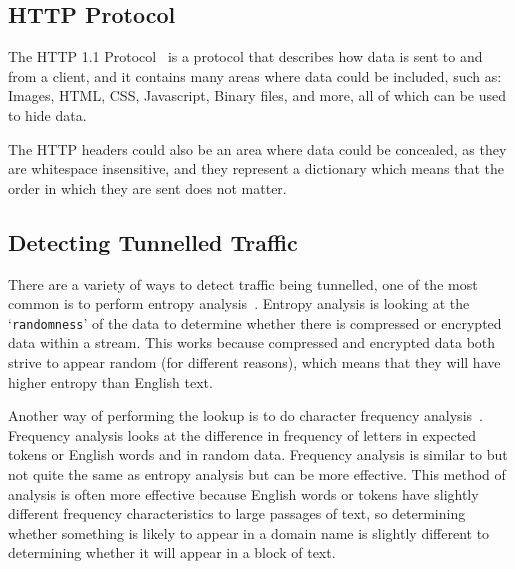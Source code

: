 \subsection{HTTP Protocol}
The HTTP 1.1 Protocol~\cite{rfc2616} is a protocol that describes how data is sent to and from a client, and it contains many areas where data could be included, such as:
Images,
HTML,
CSS,
Javascript,
Binary files,
and more, all of which can be used to hide data.\par
The HTTP headers could also be an area where data could be concealed, as they are whitespace insensitive, and they represent a dictionary which means that the order in which they are sent does not matter.

\subsection{Detecting Tunnelled Traffic}
There are a variety of ways to detect traffic being tunnelled, one of the most common is to perform entropy analysis~\cite{detectingdns}.
Entropy analysis is looking at the `\texttt{randomness}' of the data to determine whether there is compressed or encrypted data within a stream. This works because compressed and encrypted data both strive to appear random (for different reasons), which means that they will have higher entropy than English text.\par
Another way of performing the lookup is to do character frequency analysis~\cite{freqanal}.
Frequency analysis looks at the difference in frequency of letters in expected tokens or English words and in random data. Frequency analysis is similar to but not quite the same as entropy analysis but can be more effective.
This method of analysis is often more effective because English words or tokens have slightly different frequency characteristics to large passages of text, so determining whether something is likely to appear in a domain name is slightly different to determining whether it will appear in a block of text.

